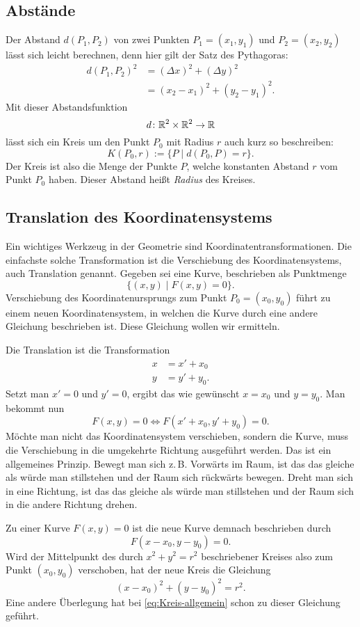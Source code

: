 \subsection{Abstände}

Der Abstand $d(P_1,P_2)$ von zwei Punkten
$P_1=(x_1,y_1)$ und $P_2=(x_2,y_2)$ lässt sich leicht berechnen,
denn hier gilt der Satz des Pythagoras:%
\[\begin{split}
d(P_1,P_2)^2 &= (\Delta x)^2+(\Delta y)^2\\
&= (x_2-x_1)^2+(y_2-y_1)^2.
\end{split}\]
Mit dieser Abstandsfunktion
\[d\colon \mathbb R^2\times\mathbb R^2\to\mathbb R\]
lässt sich ein Kreis um den Punkt $P_0$ mit Radius $r$
auch kurz so beschreiben:%
\[K(P_0,r) := \{P\mid d(P_0,P)=r\}.\]
Der Kreis ist also die Menge der Punkte $P$, welche konstanten
Abstand $r$ vom Punkt $P_0$ haben. Dieser Abstand heißt \emph{Radius}
des Kreises.

\subsection{Translation des Koordinatensystems}

Ein wichtiges Werkzeug in der Geometrie sind
Koordinatentransformationen. Die einfachste solche Transformation
ist die Verschiebung des Koordinatensystems, auch Translation
genannt.
Gegeben sei eine Kurve, beschrieben als Punktmenge%
\[\{(x,y)\mid F(x,y)=0\}.\]
Verschiebung des Koordinatenursprungs zum Punkt $P_0=(x_0,y_0)$
führt zu einem neuen Koordinatensystem, in welchen die Kurve durch
eine andere Gleichung beschrieben ist. Diese Gleichung wollen wir
ermitteln.

Die Translation ist die Transformation
\[\begin{split}
x &= x'+x_0\\
y &= y'+y_0.
\end{split}\]
Setzt man $x'=0$ und $y'=0$, ergibt das wie gewünscht
$x=x_0$ und $y=y_0$. Man bekommt nun
\[F(x,y)=0 \iff F(x'+x_0, y'+y_0)=0.\]
Möchte man nicht das Koordinatensystem verschieben, sondern
die Kurve, muss die Verschiebung in die umgekehrte Richtung
ausgeführt werden. Das ist ein allgemeines Prinzip. Bewegt man
sich z.\,B. Vorwärts im Raum, ist das das gleiche als würde man
stillstehen und der Raum sich rückwärts bewegen. Dreht man sich
in eine Richtung, ist das das gleiche als würde man stillstehen
und der Raum sich in die andere Richtung drehen.

Zu einer Kurve $F(x,y)=0$ ist die neue Kurve demnach beschrieben
durch%
\[F(x-x_0, y-y_0) = 0.\]
Wird der Mittelpunkt des durch $x^2+y^2=r^2$ beschriebener Kreises
also zum Punkt $(x_0,y_0)$ verschoben, hat der neue Kreis die
Gleichung
\[(x-x_0)^2 + (y-y_0)^2 = r^2.\]
Eine andere Überlegung hat bei \eqref{eq:Kreis-allgemein}
schon zu dieser Gleichung geführt.

